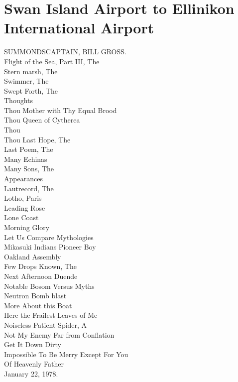 \documentclass[smalldemyvopaper,11pt,twoside,onecolumn,openright,extrafontsizes]{memoir}
\begin{document}
\chapter{Swan Island Airport to Ellinikon International Airport}
SUMMONDSCAPTAIN, BILL GROSS.
\\Flight of the Sea, Part III, The
\\Stern marsh, The
\\Swimmer, The
\\Swept Forth, The
\\Thoughts
\\Thou Mother with Thy Equal Brood
\\Thou Queen of Cytherea
\\Thou
\\Thou Last Hope, The
\\Last Poem, The
\\Many Echinas
\\Many Sons, The
\\Appearances
\\Lautrecord, The
\\Lotho, Paris
\\Leading Rose
\\Lone Coast
\\Morning Glory
\\Let Us Compare Mythologies
\\Mikasuki Indians Pioneer Boy
\\Oakland Assembly
\\Few Drops Known, The
\\Next Afternoon Duende
\\Notable Bosom Versus Myths
\\Neutron Bomb blast
\\More About this Boat
\\Here the Frailest Leaves of Me
\\Noiseless Patient Spider, A
\\Not My Enemy Far from Conflation
\\Get It Down Dirty
\\Impossible To Be Merry Except For You
\\Of Heavenly Father
\\January 22, 1978.
\end{document}
